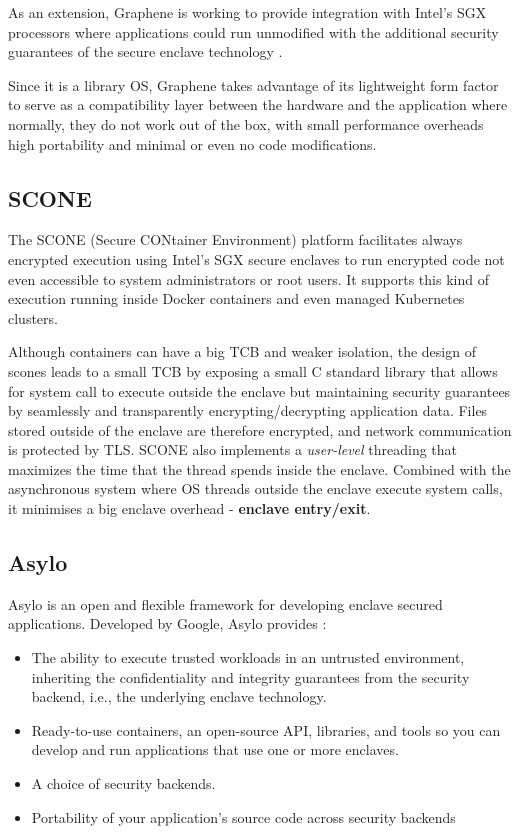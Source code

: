 As an extension, Graphene is working to provide integration with Intel's \gls{SGX} processors where applications could run unmodified with the additional security guarantees of the secure enclave technology \cite{graphene:2}.

Since it is a library OS, Graphene takes advantage of its lightweight form factor to serve as a compatibility layer between the hardware and the application where normally, they do not work out of the box, with small performance overheads high portability and minimal or even no code modifications.

\subsection{SCONE}
\label{ssec:scone}

The SCONE \cite{scone:1} (Secure CONtainer Environment) platform facilitates always encrypted execution using Intel's \gls{SGX} secure enclaves to run encrypted code not even accessible to system administrators or root users. It supports this kind of execution running inside Docker containers and even managed Kubernetes clusters.

Although containers can have a big \gls{TCB} and weaker isolation, the design of scones leads to a small \gls{TCB} by exposing a small C standard library that allows for system call to execute outside the enclave but maintaining security guarantees by seamlessly and transparently encrypting/decrypting application data. Files stored outside of the enclave are therefore encrypted, and network communication is protected by \gls{TLS}. SCONE also implements a \textit{user-level} threading that maximizes the time that the thread spends inside the enclave. Combined with the asynchronous system where OS threads outside the enclave execute system calls, it minimises a big enclave overhead - \textbf{enclave entry/exit}.

\subsection{Asylo}
\label{ssec:asylo}

Asylo \cite{asylo:1} is an open and flexible framework for developing enclave secured applications. Developed by Google, Asylo provides \cite{asylo:2}:

\begin{itemize}
  \item The ability to execute trusted workloads in an untrusted environment, inheriting the confidentiality and integrity guarantees from the security backend, i.e., the underlying enclave technology.
  \item Ready-to-use containers, an open-source API, libraries, and tools so you can develop and run applications that use one or more enclaves.
  \item A choice of security backends.
  \item Portability of your application's source code across security backends
\end{itemize}

